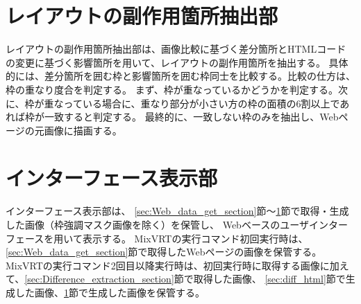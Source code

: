 \section{レイアウトの副作用箇所抽出部}\label{sec:Layout_subEffect_extraction_section}
レイアウトの副作用箇所抽出部は、画像比較に基づく差分箇所とHTMLコードの変更に基づく影響箇所を用いて、レイアウトの副作用箇所を抽出する。
具体的には、差分箇所を囲む枠と影響箇所を囲む枠同士を比較する。比較の仕方は、枠の重なり度合を判定する。
まず、枠が重なっているかどうかを判定する。次に、枠が重なっている場合に、重なり部分が小さい方の枠の面積の6割以上であれば枠が一致すると判定する。
最終的に、一致しない枠のみを抽出し、Webページの元画像に描画する。


\section{インターフェース表示部}\label{sec:Interface_Display_Section}
インターフェース表示部は、
\ref{sec:Web_data_get_section}節～\ref{sec:Layout_subEffect_extraction_section}節で取得・生成した画像（枠強調マスク画像を除く）を保管し、
Webベースのユーザインターフェースを用いて表示する。
MixVRTの実行コマンド初回実行時は、\ref{sec:Web_data_get_section}節で取得したWebページの画像を保管する。
MixVRTの実行コマンド2回目以降実行時は、初回実行時に取得する画像に加えて、\ref{sec:Difference_extraction_section}節で取得した画像、
\ref{sec:diff_html}節で生成した画像、\ref{sec:Layout_subEffect_extraction_section}節で生成した画像を保管する。








